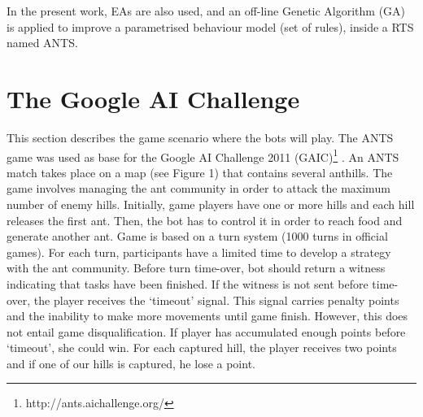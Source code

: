\documentclass[runningheads]{llncs}
\begin{document}

In the present work, EAs are also used, and an off-line Genetic Algorithm (GA) is applied to improve a parametrised behaviour model (set of rules), inside a RTS named ANTS.




\section{The Google AI Challenge}

This section describes the game scenario where the bots will play. The ANTS game was used as base for the Google AI Challenge 2011
 (GAIC)\footnote{http://ants.aichallenge.org/} \cite{holdum2011google}. An ANTS match takes place on a map (see Figure 1) %
that contains several anthills. The game involves managing the ant community in order to attack the maximum number of enemy hills. Initially, game players have one or more hills and each hill releases the first ant. Then, the bot has to control it in order to reach food and generate another ant. Game is based on a turn system (1000 turns in official games). For each turn, participants have a limited time to develop a strategy with the ant community. Before turn time-over, bot should return a witness indicating that tasks have been finished. If the witness is not sent before time-over, the player receives the `timeout' signal. This signal carries penalty points and the inability to make more movements until game finish. However, this does not entail game disqualification. If player has accumulated enough points before `timeout', she could win. For each captured hill, the player receives two points and if one of our hills is captured, he lose a point.


\end{document}
